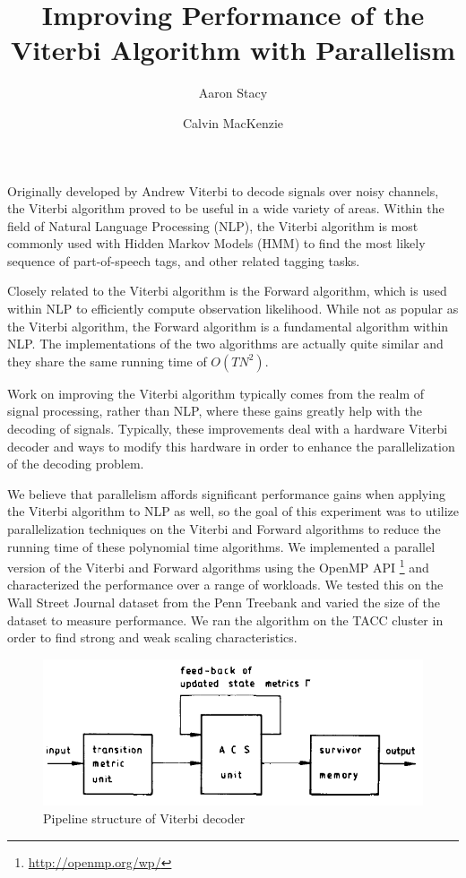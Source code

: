 \documentclass[11pt,onecolumn]{article}
\begin{document}
\title{Improving Performance of the Viterbi Algorithm with Parallelism}

\author{
 Aaron Stacy \\ \and
 Calvin MacKenzie \\
}

\maketitle


Originally developed by Andrew Viterbi to decode signals over noisy channels, the Viterbi algorithm proved to be useful in a wide variety of areas. Within the field of Natural Language Processing (NLP), the Viterbi algorithm is most commonly used with Hidden Markov Models (HMM) to find the most likely sequence of part-of-speech tags, and other related tagging tasks.

Closely related to the Viterbi algorithm is the Forward algorithm, which is used within NLP to efficiently compute observation likelihood. While not as popular as the Viterbi algorithm, the Forward algorithm is a fundamental algorithm within NLP. The implementations of the two algorithms are actually quite similar and they share the same running time of $O(T N^2)$.

Work on improving the Viterbi algorithm typically comes from the realm of signal processing, rather than NLP, where these gains greatly help with the decoding of signals. Typically, these improvements deal with a hardware Viterbi decoder and ways to modify this hardware in order to enhance the parallelization of the decoding problem.

We believe that parallelism affords significant performance gains when applying the Viterbi algorithm to NLP as well, so the goal of this experiment was to utilize parallelization techniques on the Viterbi and Forward algorithms to reduce the running time of these polynomial time algorithms. We implemented a parallel version of the Viterbi and Forward algorithms using the OpenMP API \footnote{\url{http://openmp.org/wp/}} and characterized the performance over a range of workloads. We tested this on the Wall Street Journal dataset from the Penn Treebank and varied the size of the dataset to measure performance. We ran the algorithm on the TACC cluster in order to find strong and weak scaling characteristics.


\begin{figure}[h!]
\centering
\includegraphics[width=.5\linewidth]{figures/pipeline}
\caption{Pipeline structure of Viterbi decoder}
\label{fig:pipeline}
\end{figure}
\end{document}
